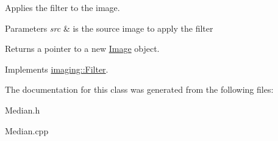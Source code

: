 Applies the filter to the image.


\begin{DoxyParams}{Parameters}
{\em src} & is the source image to apply the filter\\
\hline
\end{DoxyParams}
\begin{DoxyReturn}{Returns}
a pointer to a new \hyperlink{classimaging_1_1_image}{Image} object. 
\end{DoxyReturn}


Implements \hyperlink{classimaging_1_1_filter_ab153f2e4e89dd744806299a29da8289b}{imaging\+::\+Filter}.



The documentation for this class was generated from the following files\+:\begin{DoxyCompactItemize}
\item 
Median.\+h\item 
Median.\+cpp\end{DoxyCompactItemize}

